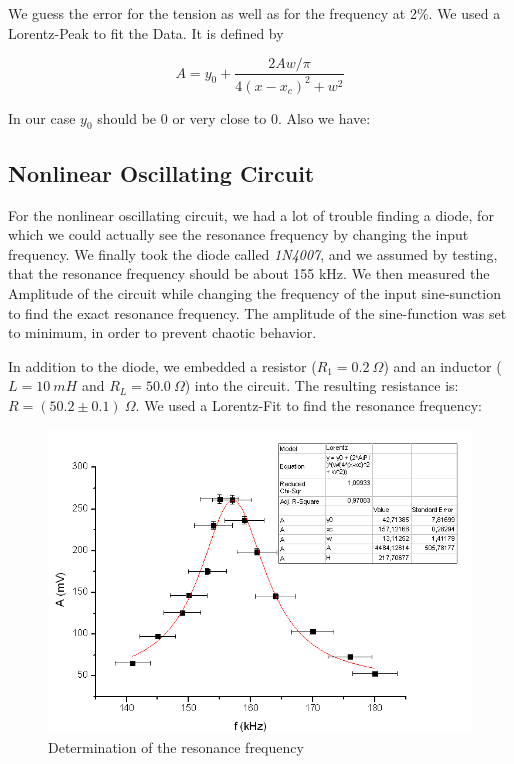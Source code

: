 We guess the error for the tension as well as for the frequency at 2\%. We used a Lorentz-Peak to fit the Data. It is defined by 

$$ A = y_0 + \frac{2Aw/\pi}{4(x-x_c)^2 + w^2} $$

In our case $y_0$ should be 0 or very close to 0. Also we have:

\subsection{Nonlinear Oscillating Circuit}

For the nonlinear oscillating circuit, we had a lot of trouble finding a diode, for which we could actually see the resonance frequency by changing the input frequency. We finally took the diode called \emph{1N4007}, and we assumed by testing, that the resonance frequency should be about 155 kHz. We then measured the Amplitude of the circuit while changing the frequency of the input sine-sunction to find the exact resonance frequency. The amplitude of the sine-function was set to minimum, in order to prevent chaotic behavior.

In addition to the diode, we embedded a resistor ($R_1= 0.2 \ \Omega$) and an inductor ($L=10\ mH$ and $R_L = 50.0\ \Omega$) into the circuit. The resulting resistance is: $R = (50.2 \pm 0.1)\ \Omega$. We used a Lorentz-Fit to find the resonance frequency:

\begin{figure}[H]
\centering \includegraphics[width=\textwidth]{Bilder/fresnl.png}
\caption{Determination of the resonance frequency}
\end{figure}

